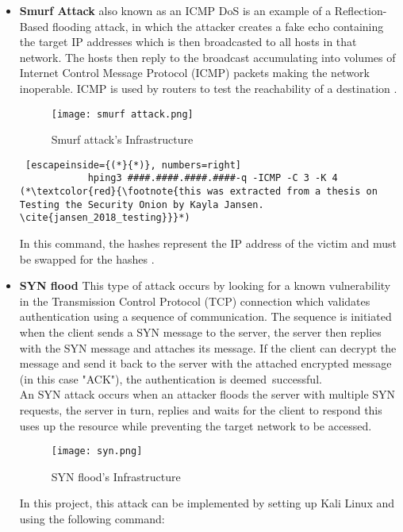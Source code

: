 \documentclass[12pt]{article}
\begin{document}
	\begin{itemize}\label{ICMP}
		\item \textbf{Smurf Attack} also known as an ICMP DoS is an example of a Reflection-Based flooding attack, in which the attacker creates a fake echo containing the target IP addresses which is then broadcasted to all hosts in that network. The hosts then reply to the broadcast accumulating into volumes of Internet Control Message Protocol (ICMP) packets making the network inoperable. ICMP is used by routers to test the reachability of a destination \cite{kumar_2007_smurf}.
		\begin{center}
			\begin{figure}[H]
				\centering
				\texttt{[image: smurf attack.png]}
				\caption{Smurf attack's Infrastructure \cite{kumar_2007_smurf}}
				\label{fig:Smurf}
			\end{figure}
		\end{center}
		
		
		
		
		\begin{lstlisting} [escapeinside={(*}{*)}, numbers=right]
			hping3 ####.####.####.####-q -ICMP -C 3 -K 4 (*\textcolor{red}{\footnote{this was extracted from a thesis on Testing the Security Onion by Kayla Jansen. \cite{jansen_2018_testing}}}*) \end{lstlisting} 
		In this command, the hashes represent the IP address of the victim and must be swapped for the hashes \cite{jansen_2018_testing}.
		
		
		
		
		\item \textbf{SYN flood} This type of attack occurs by looking for a known vulnerability in the Transmission Control Protocol (TCP) connection which validates authentication using a sequence of communication. The sequence is initiated when the client sends a SYN message to the server, the server then replies with the SYN message and attaches its message. If the client can decrypt the message and send it back to the server with the attached encrypted message (in this case "ACK"), the authentication is deemed successful. 
		\\
		An SYN attack occurs when an attacker floods the server with multiple SYN requests, the server in turn, replies and waits for the client to respond this uses up the resource while preventing the target network to be accessed.
		
		\begin{center}
			\begin{figure}[H]
				\centering
				\texttt{[image:  syn.png]}
				\caption{SYN flood's Infrastructure \cite{lemon_2002_resisting}}
				\label{fig:syn}
			\end{figure}
		\end{center}
		In this project, this attack can be implemented by setting up Kali Linux and using the following command: \cite{jansen_2018_testing}
		

\end{itemize}
\end{document}
